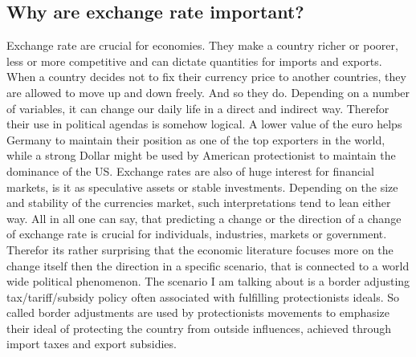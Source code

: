 \subsection{Why are exchange rate important?}
Exchange rate are crucial for economies. They make a country richer or poorer, less or more competitive and can dictate quantities for imports and exports. When a country decides not to fix their currency price to another countries, they are allowed to move up and down freely. And so they do. Depending on a number of variables, it can change our daily life in a direct and indirect way. Therefor their use in political agendas is somehow logical. A lower value of the euro helps Germany to maintain their position as one of the top exporters in the world, while a strong Dollar might be used by American protectionist to maintain the dominance of the US. Exchange rates are also of huge interest for financial markets, is it as speculative assets or stable investments. Depending on the size and stability of the currencies market, such interpretations tend to lean either way.
All in all one can say, that predicting a change or the direction of a change of exchange rate is crucial for individuals, industries, markets or government. Therefor its rather surprising that the economic literature focuses more on the change itself then the direction in a specific scenario, that is connected to a world wide political phenomenon. The scenario I am talking about is a border adjusting tax/tariff/subsidy policy often associated with fulfilling protectionists ideals. So called border adjustments are used by protectionists movements to emphasize their ideal of protecting the country from outside influences, achieved through import taxes and export subsidies.
